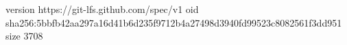 version https://git-lfs.github.com/spec/v1
oid sha256:5bbfb42aa297a16d41b6d235f9712b4a27498d3940fd99523c8082561f3dd951
size 3708
